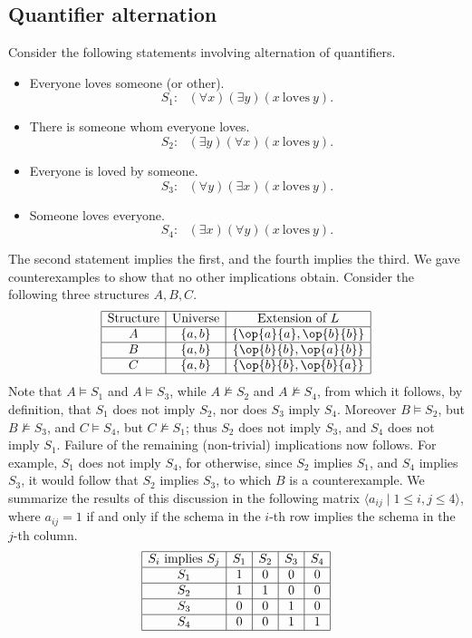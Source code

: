 \subsection{Quantifier alternation}
Consider the following statements involving alternation of quantifiers.
\begin{itemize}
\item
Everyone loves someone (or other).
\[S_1:\ \ \ (\forall x)(\exists y)(x\ \mathrm{loves}\ y).\]
\item
There is someone whom everyone loves.
\[S_2:\ \ \ (\exists y)(\forall x)(x\ \mathrm{loves}\ y).\]
\item
Everyone is loved by someone.
\[S_3:\ \ \ (\forall y)(\exists x)(x\ \mathrm{loves}\ y).\]
\item
Someone loves everyone.
\[S_4:\ \ \ (\exists x)(\forall y)(x\ \mathrm{loves}\ y).\]
\end{itemize}
The second statement implies the first, and the fourth implies the third. We gave  counterexamples to show that no other implications obtain. Consider the following three structures $A, B, C$. 
\[
\begin{array}{| c | c | c |}
\hline
 \mbox{Structure}& \mbox{Universe} & \mbox{Extension of }L\\
  \hline			
  A & \{a,b\} & \{\op{a}{a},\op{b}{b}\}\\
  \hline
  B & \{a,b\} & \{\op{b}{b},\op{a}{b}\}\\
 \hline
 C & \{a,b\} & \{\op{b}{b},\op{b}{a}\}\\
 \hline  
\end{array}
\]
Note that $A\models S_1$ and $A\models S_3$, while $A\not\models S_2$ and $A\not\models S_4$, from which it follows, by definition, that $S_1$ does not imply $S_2$, nor does $S_3$ imply $S_4$. Moreover $B\models S_2$, but $B\not\models S_3$, and $C\models S_4$, but $C\not\models S_1$; thus $S_2$ does not imply $S_3$, and $S_4$ does not imply $S_1$. Failure of the remaining (non-trivial) implications now follows. For example, $S_1$ does not imply $S_4$, for otherwise, since $S_2$ implies $S_1$, and $S_4$ implies $S_3$, it would follow that $S_2$ implies $S_3$, to which $B$ is a counterexample.
We summarize the results of this discussion in the following matrix $\langle a_{ij}\mid 1\leq i,j\leq 4\rangle$, where $a_{ij} = 1$ if and only if the schema in the $i$-th row implies the schema in the $j$-th column.
\[
\begin{array}{| c | c | c | c | c|}
\hline
 S_i\mbox{ implies }S_j& S_1 & S_2 & S_3 & S_4\\
  \hline			
  S_1 & 1 & 0 & 0 & 0\\
  \hline
  S_2  & 1 & 1 & 0 & 0\\
 \hline
 S_3 & 0 & 0 & 1 & 0\\
 \hline
 S_4 & 0 & 0 & 1 & 1\\
 \hline  
\end{array}
\]
